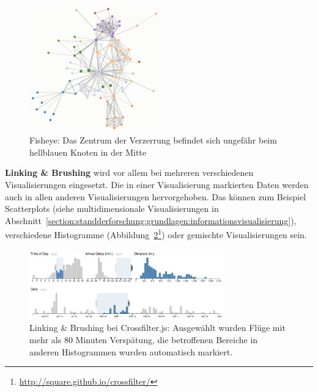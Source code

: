 \documentclass[
	headsepline,
	footsepline,
	fontsize=12pt,
	bibliography=totoc
]{scrbook}
\begin{document}
\begin{figure}[htbp]
   \centering
   \includegraphics[width=0.5\textwidth]{images/grundlagen-fisheye.png}
   \caption{Fisheye: Das Zentrum der Verzerrung befindet sich ungefähr beim hellblauen Knoten in der Mitte}
   \label{figure:fisheye}
\end{figure}


\textbf{Linking \& Brushing} wird vor allem bei mehreren verschiedenen Visualisierungen eingesetzt. Die in einer Visualisierung markierten Daten werden auch in allen anderen Visualisierungen hervorgehoben. Das können zum Beispiel Scatterplots (siehe multidimensionale Visualisierungen in Abschnitt~\ref{section:standderforschung:grundlagen:informationsvisualisierung}), verschiedene Histogramme (Abbildung~\ref{figure:link_brush}\footnote{\url{http://square.github.io/crossfilter/}}) oder gemischte Visualisierungen sein.

\begin{figure}[htbp]
   \centering
   \includegraphics[width=0.75\textwidth]{images/grundlagen-link_brush.png}
   \caption{Linking \& Brushing bei Crossfilter.js: Ausgewählt wurden Flüge mit mehr als 80 Minuten Verspätung, die betroffenen Bereiche in anderen Histogrammen wurden automatisch markiert.}
   \label{figure:link_brush}
\end{figure}
\end{document}
